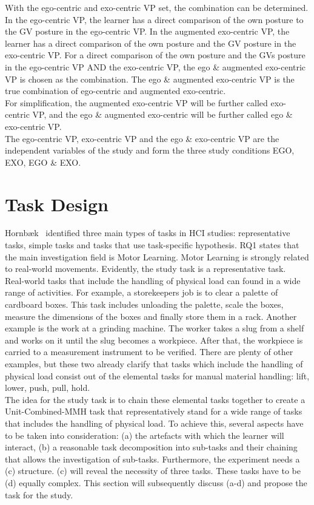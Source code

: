 With the ego-centric and exo-centric VP set, the combination can be determined. In the ego-centric VP, the learner has a direct comparison of the own posture to the GV posture in the ego-centric VP. In the augmented exo-centric VP, the learner has a direct comparison of the own posture and the GV posture in the exo-centric VP. For a direct comparison of the own posture and the GVs posture in the ego-centric VP AND the exo-centric VP, the ego \& augmented exo-centric VP is chosen as the combination. The ego \& augmented exo-centric VP is the true combination of ego-centric and augmented exo-centric.\\
For simplification, the augmented exo-centric VP will be further called exo-centric VP, and the ego \& augmented exo-centric will be further called ego \& exo-centric VP.\\
The ego-centric VP, exo-centric VP and the ego \& exo-centric VP are the independent variables of the study and form the three study conditions EGO, EXO, EGO \& EXO.

\section{Task Design}
\label{sec:taskDesign}
Hornb\ae{}k~\cite{hornbaek} identified three main types of tasks in HCI studies: representative tasks, simple tasks and tasks that use task-specific hypothesis. RQ1 states that the main investigation field is Motor Learning. Motor Learning is strongly related to real-world movements. Evidently, the study task is a representative task.\\
Real-world tasks that include the handling of physical load can found in a wide range of activities. For example, a storekeepers job is to clear a palette of cardboard boxes. This task includes unloading the palette, scale the boxes, measure the dimensions of the boxes and finally store them in a rack. Another example is the work at a grinding machine. The worker takes a slug from a shelf and works on it until the slug becomes a workpiece. After that, the workpiece is carried to a measurement instrument to be verified. There are plenty of other examples, but these two already clarify that tasks which include the handling of physical load consist out of the elemental tasks for manual material handling: lift, lower, push, pull, hold.\\
The idea for the study task is to chain these elemental tasks together to create a Unit-Combined-MMH task that representatively stand for a wide range of tasks that includes the handling of physical load. To achieve this, several aspects have to be taken into consideration: (a) the artefacts with which the learner will interact, (b) a reasonable task decomposition into sub-tasks and their chaining that allows the investigation of sub-tasks. Furthermore, the experiment needs a (c) structure. (c) will reveal the necessity of three tasks. These tasks have to be (d) equally complex. This section will subsequently discuss (a-d) and propose the task for the study.

